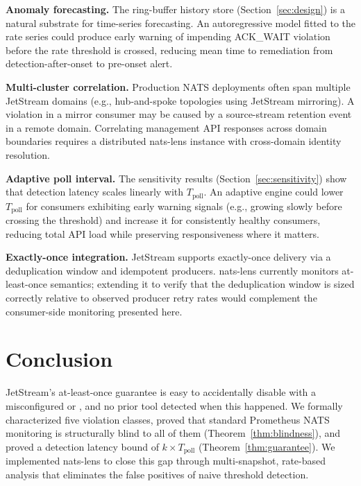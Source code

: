 \documentclass[journal]{IEEEtran}
\begin{document}
\textbf{Anomaly forecasting.} The ring-buffer history store
(Section~\ref{sec:design}) is a natural substrate for time-series
forecasting. An autoregressive model fitted to the 
rate series could produce early warning of impending ACK\_WAIT violation
before the rate threshold is crossed, reducing mean time to remediation
from detection-after-onset to pre-onset alert.

\textbf{Multi-cluster correlation.} Production NATS deployments often
span multiple JetStream domains (e.g., hub-and-spoke topologies using
JetStream mirroring). A violation in a mirror consumer may be caused by
a source-stream retention event in a remote domain. Correlating
management API responses across domain boundaries requires a distributed
nats-lens instance with cross-domain identity resolution.

\textbf{Adaptive poll interval.} The sensitivity results
(Section~\ref{sec:sensitivity}) show that detection latency scales
linearly with $T_\text{poll}$. An adaptive engine could lower
$T_\text{poll}$ for consumers exhibiting early warning signals
(e.g.,  growing slowly before crossing the
threshold) and increase it for consistently healthy consumers, reducing
total API load while preserving responsiveness where it matters.

\textbf{Exactly-once integration.} JetStream supports exactly-once
delivery via a deduplication window and idempotent producers. nats-lens
currently monitors at-least-once semantics; extending it to verify that
the deduplication window is sized correctly relative to observed
producer retry rates would complement the consumer-side monitoring
presented here.

\section{Conclusion}
\label{sec:conclusion}

JetStream's at-least-once guarantee is easy to accidentally disable with
a misconfigured  or , and no prior
tool detected when this happened. We formally characterized five violation
classes, proved that standard Prometheus NATS monitoring is structurally
blind to all of them (Theorem~\ref{thm:blindness}), and proved a
detection latency bound of $k \times T_\text{poll}$
(Theorem~\ref{thm:guarantee}). We implemented nats-lens to close this
gap through multi-snapshot, rate-based analysis that eliminates the false
positives of naive threshold detection.
\end{document}
